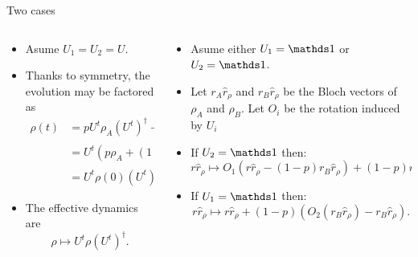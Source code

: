 \begin{frame}{Two cases}
    \begin{columns}
        \begin{column}{0.5\textwidth}
            \begin{itemize}
                \item Asume $U_{1}= U_{2}=U$.
                \item Thanks to symmetry, the evolution may be factored as
                \begin{align*}
                    \rho(t)&=pU^{t}\rho_{A}(U^{t})^{\dag}+(1-p)U^{t}\rho_{B}(U^{t})^{\dag} \\
                    &=U^{t}(p\rho_{A}+(1-p)\rho_{B})(U^{t})^{\dag}\\
                    &=U^{t}\rho(0)(U^{t})^{\dag}.
                    \end{align*}
                \item The effective dynamics are    
                \begin{equation*}
                    \rho\mapsto U^{t}\rho(U^{t})^{\dag}.
                \end{equation*}
            \end{itemize}
        \end{column}
        \begin{column}{0.5\textwidth}
            \begin{itemize}
                \item Asume either $U_{1}=\Id$ or $U_{2}=\Id$.
                \item Let $r_{A}\hat{r}_{\rho}$ and $r_{B}\hat{r}_{\rho}$ be the Bloch vectors of $\rho_{A}$ and $\rho_{B}$. Let $O_{i}$ be the rotation induced by $U_{i}$
                \item If $U_{2}=\Id$ then:
                \begin{equation*}
                    r\hat{r}_{\rho}\mapsto O_{1}(r\hat{r}_{\rho}-(1-p)r_{B}\hat{r}_{\rho})+(1-p)r_{B}\hat{r}_{\rho}.
                \end{equation*}
                \item If $U_{1}=\Id$ then:
                \begin{equation*}
                    r\hat{r}_{\rho}\mapsto r\hat{r}_{\rho}+(1-p)(O_{2}(r_{B}\hat{r}_{\rho})-r_{B}\hat{r}_{\rho}).
                \end{equation*}
            \end{itemize}
        \end{column}
    \end{columns}
\end{frame}




